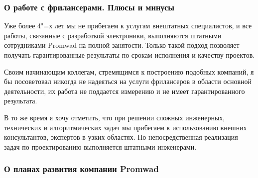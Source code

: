 \documentclass[10pt, a5paper]{article}
\begin{document}
\subsubsection*{О работе с фрилансерами. Плюсы и минусы}

Уже более 4"=х лет мы не прибегаем к услугам внештатных специалистов, и все работы, связанные с разработкой электроники, выполняются штатными сотрудниками Promwad на полной занятости. Только такой подход позволяет получать гарантированные результаты по срокам исполнения и качеству проектов. 

Своим начинающим коллегам, стремящимся к построению подобных компаний, я бы посоветовал никогда не надеяться на услуги фрилансеров в области основной деятельности, их работа не поддается измерению и не имеет гарантированного результата.

В то же время я хочу отметить, что при решении сложных инженерных, технических и алгоритмических задач мы прибегаем к использованию внешних консультантов, экспертов в узких областях. Но непосредственная реализация задач по проектированию выполняется штатными инженерами. %

\subsubsection*{О планах развития компании Promwad}


\end{document}
